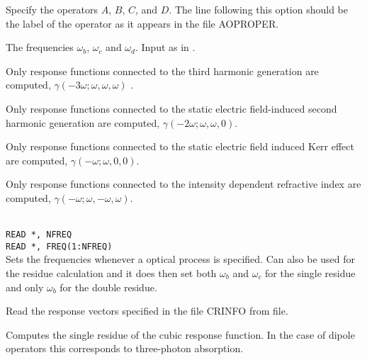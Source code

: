 \begin{description}

\item[, , , ]
Specify the operators $A$, $B$, $C$, and $D$. The line following this
option should be the label of the operator as it appears in the file
AOPROPER.

\item[, , ]
The frequencies $\omega_b$, $\omega_c$ and $\omega_d$. Input as in
.

\item{}
Only response functions connected to the third harmonic
generation are
computed, $\gamma(-3\omega;\omega,\omega,\omega)$ \cite{djpnylhajcp105}.

\item{}
Only response functions connected to the static electric field-induced
second harmonic generation are computed,
$\gamma(-2\omega;\omega,\omega,0)$.

\item{}
Only response functions connected to the static electric field induced
Kerr effect are computed,
$\gamma(-\omega;\omega,0,0)$.

\item{}
Only response functions connected to the intensity dependent 
refractive index are computed,
$\gamma(-\omega;\omega,-\omega,\omega)$.

\item{}\\
\verb|READ *, NFREQ|\\
\verb|READ *, FREQ(1:NFREQ)|\\
Sets the frequencies whenever a optical process is specified.
Can also be used for the residue calculation and it does then set 
both $\omega_b$ and $\omega_c$ for the single residue and only
$\omega_b$ for the double residue.

\item{}
Read the response vectors specified in the file CRINFO from
file.

\item{}
Computes the single residue of the cubic
response function.
In the case of dipole operators this corresponds to
three-photon absorption.


\end{description}
